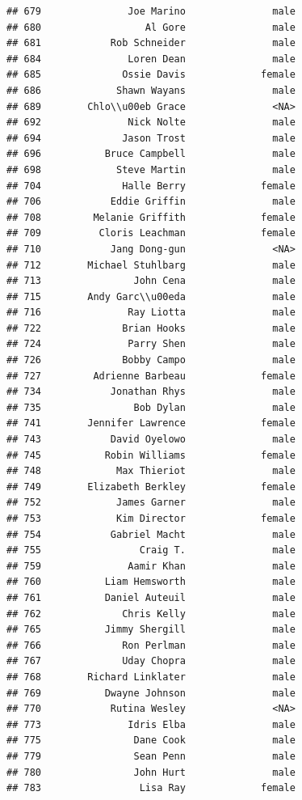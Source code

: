 \documentclass[
]{article}
\begin{document}
\begin{verbatim}
## 679               Joe Marino               male
## 680                  Al Gore               male
## 681            Rob Schneider               male
## 684               Loren Dean               male
## 685              Ossie Davis             female
## 686             Shawn Wayans               male
## 689        Chlo\\u00eb Grace               <NA>
## 692               Nick Nolte               male
## 694              Jason Trost               male
## 696           Bruce Campbell               male
## 698             Steve Martin               male
## 704              Halle Berry             female
## 706            Eddie Griffin               male
## 708         Melanie Griffith             female
## 709          Cloris Leachman             female
## 710            Jang Dong-gun               <NA>
## 712        Michael Stuhlbarg               male
## 713                John Cena               male
## 715        Andy Garc\\u00eda               male
## 716               Ray Liotta               male
## 722              Brian Hooks               male
## 724               Parry Shen               male
## 726              Bobby Campo               male
## 727         Adrienne Barbeau             female
## 734            Jonathan Rhys               male
## 735                Bob Dylan               male
## 741        Jennifer Lawrence             female
## 743            David Oyelowo               male
## 745           Robin Williams             female
## 748             Max Thieriot               male
## 749        Elizabeth Berkley             female
## 752             James Garner               male
## 753             Kim Director             female
## 754            Gabriel Macht               male
## 755                 Craig T.               male
## 759               Aamir Khan               male
## 760           Liam Hemsworth               male
## 761           Daniel Auteuil               male
## 762              Chris Kelly               male
## 765           Jimmy Shergill               male
## 766              Ron Perlman               male
## 767              Uday Chopra               male
## 768        Richard Linklater               male
## 769           Dwayne Johnson               male
## 770            Rutina Wesley               <NA>
## 773               Idris Elba               male
## 775                Dane Cook               male
## 779                Sean Penn               male
## 780                John Hurt               male
## 783                 Lisa Ray             female

\end{verbatim}
\end{document}
